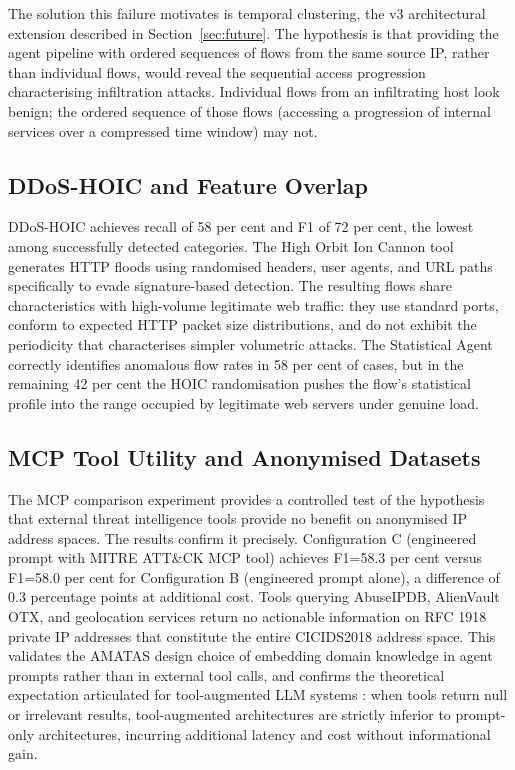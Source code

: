 The solution this failure motivates is temporal clustering, the v3 architectural extension described in Section~\ref{sec:future}. The hypothesis is that providing the agent pipeline with ordered sequences of flows from the same source IP, rather than individual flows, would reveal the sequential access progression characterising infiltration attacks. Individual flows from an infiltrating host look benign; the ordered sequence of those flows (accessing a progression of internal services over a compressed time window) may not.

\subsection{DDoS-HOIC and Feature Overlap}
\label{sec:hoic}

DDoS-HOIC achieves recall of 58 per cent and F1 of 72 per cent, the lowest among successfully detected categories. The High Orbit Ion Cannon tool generates HTTP floods using randomised headers, user agents, and URL paths specifically to evade signature-based detection. The resulting flows share characteristics with high-volume legitimate web traffic: they use standard ports, conform to expected HTTP packet size distributions, and do not exhibit the periodicity that characterises simpler volumetric attacks. The Statistical Agent correctly identifies anomalous flow rates in 58 per cent of cases, but in the remaining 42 per cent the HOIC randomisation pushes the flow's statistical profile into the range occupied by legitimate web servers under genuine load.

\subsection{MCP Tool Utility and Anonymised Datasets}

The MCP comparison experiment provides a controlled test of the hypothesis that external threat intelligence tools provide no benefit on anonymised IP address spaces. The results confirm it precisely. Configuration C (engineered prompt with MITRE ATT\&CK MCP tool) achieves F1=58.3 per cent versus F1=58.0 per cent for Configuration B (engineered prompt alone), a difference of 0.3 percentage points at additional cost. Tools querying AbuseIPDB, AlienVault OTX, and geolocation services return no actionable information on RFC 1918 private IP addresses that constitute the entire CICIDS2018 address space. This validates the AMATAS design choice of embedding domain knowledge in agent prompts rather than in external tool calls, and confirms the theoretical expectation articulated for tool-augmented LLM systems \autocite{Schick2023, Yao2023, Qin2024}: when tools return null or irrelevant results, tool-augmented architectures are strictly inferior to prompt-only architectures, incurring additional latency and cost without informational gain.

